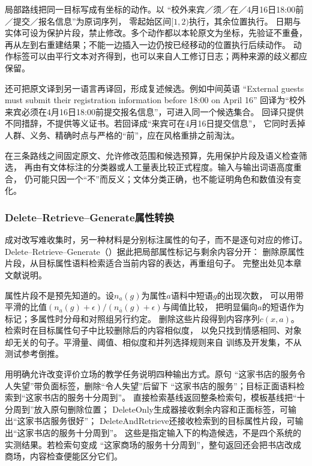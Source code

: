 局部路线把同一目标写成有坐标的动作。以
“校外来宾／须／在／4月16日18:00前／提交／报名信息”为原词序列，
零起始区间$[1,2)$执行，其余位置执行。
日期与实体可设为保护片段，禁止修改。多个动作都以本轮原文为坐标，先验证不重叠，
再从左到右重建结果；不能一边插入一边仍按已经移动的位置执行后续动作。
动作标签可以由平行文本对齐得到，也可以来自人工修订日志；两种来源的歧义都应保留。

还可把原文译到另一语言再译回，形成复述候选。例如中间英语
“External guests must submit their registration information before 18:00 on April 16”
回译为“校外来宾必须在4月16日18:00前提交报名信息”，可进入同一个候选集合。
回译只提供不同措辞，不提供等义证书。若回译成“来宾可在4月16日提交信息”，
它同时丢掉人群、义务、精确时点与严格的“前”，应在风格重排之前淘汰。

在三条路线之间固定原文、允许修改范围和候选预算，先用保护片段及语义检查筛选，
再由有文体标注的分类器或人工量表比较正式程度。输入与输出词语高度重合，
仍可能只因一个“不”而反义；文体分类正确，也不能证明角色和数值没有变化。

\subsubsection{Delete--Retrieve--Generate属性转换}
\label{sec:nlp-generation-delete-retrieve}

成对改写难收集时，另一种材料是分别标注属性的句子，而不是逐句对应的修订。
Delete--Retrieve--Generate（\citeyear{li-etal-2018-delete}）据此把局部属性标记与剩余内容分开：
删除原属性片段，从目标属性语料检索适合当前内容的表达，再重组句子。
完整出处见本章文献说明。

属性片段不是预先知道的。设$n_a(g)$为属性$a$语料中短语$g$的出现次数，
可以用带平滑的比值$(n_a(g)+\epsilon)/(n_{\bar a}(g)+\epsilon)$与阈值比较，
把明显偏向$a$的短语作为标记；多属性时分母和对照组另行约定。
删除这些片段得到内容序列$c(x,a)$。检索时在目标属性句子中比较删除后的内容相似度，
以免只找到情感相同、对象却无关的句子。平滑量、阈值、相似度和并列选择规则来自
训练及开发集，不从测试参考倒推。

用明确允许改变评价立场的教学任务说明四种输出方式。原句
“这家书店的服务令人失望”带负面标签，删除“令人失望”后留下
“这家书店的服务”；目标正面语料检索到“这家书店的服务十分周到”。
直接检索基线返回整条检索句，模板基线把“十分周到”放入原句删除位置；
DeleteOnly生成器接收剩余内容和正面标签，可输出“这家书店服务很好”；
DeleteAndRetrieve还接收检索到的目标属性片段，可输出“这家书店的服务十分周到”。
这些是指定输入下的构造候选，不是四个系统的实测结果。若检索句变成
“这家商场的服务十分周到”，整句返回还会把书店改成商场，内容检查便能区分它们。

